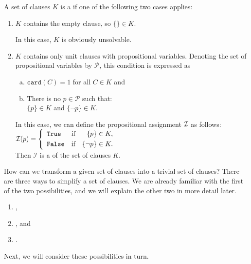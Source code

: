 \begin{Definition}
  A set of clauses $K$ is a  if one of the following two cases applies:
  \begin{enumerate}
  \item $K$ contains the empty clause, so $\{\} \in K$.

        In this case, $K$ is obviously unsolvable.
  \item $K$ contains only unit clauses with \underline{} propositional variables.
        Denoting the set of propositional variables by $\mathcal{P}$,
        this condition is expressed as 
        \begin{enumerate}[(a)]
        \item $\texttt{card}(C) = 1$ \quad for all $C \in K$ \quad and
        \item There is no $p \in \mathcal{P}$ such that: 
              \\[0.2cm]
              \hspace*{1.3cm}
              $\{p\} \in K$ \quad and \quad $\{\neg p\} \in K$.
        \end{enumerate}
        In this case, we can define the propositional assignment $\mathcal{I}$ as follows:
        \\[0.2cm]
        \hspace*{1.3cm}
        $\mathcal{I}(p) = \left\{
                   \begin{array}{lcr}
                     \texttt{True}  & \mbox{if} & \{p\}      \in K, \\[0.1cm]
                     \texttt{False} & \mbox{if} & \{\neg p\} \in K.
                   \end{array}
                 \right.
        $
        \\[0.2cm]
        Then $\mathcal{I}$ is a  of the set of clauses $K$. \eox
  \end{enumerate}
\end{Definition}

How can we transform a given set of clauses into a trivial set of clauses?
There are three ways to simplify a set of clauses.  We are already familiar with the first of the two
possibilities, and we will explain the other two in more detail later. 
\begin{enumerate}
\item {},
\item {}, and
\item {}.
\end{enumerate}
Next, we will consider these possibilities in turn.

